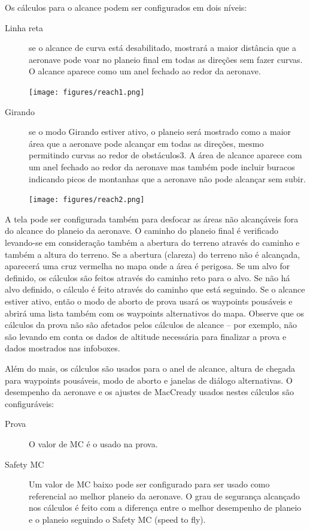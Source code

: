 Os cálculos para o alcance podem ser configurados  em dois níveis: 
\begin{description}
\item[Linha reta] se o alcance de curva está desabilitado, mostrará a maior distância 
que a aeronave pode voar no planeio final em todas as direções sem fazer curvas.  O 
alcance aparece como um anel fechado ao redor da aeronave.  

\begin{center}
\texttt{[image: figures/reach1.png]}
\end{center}

\item[Girando] se o modo Girando estiver ativo, o planeio será mostrado como a maior área 
que a aeronave pode alcançar em todas as direções, mesmo permitindo curvas ao redor de 
obstáculos3.  A área de alcance aparece com um anel fechado ao redor da aeronave mas 
também pode incluir buracos indicando picos de montanhas que a aeronave não pode alcançar 
sem subir.

\begin{center}
\texttt{[image: figures/reach2.png]}
\end{center}

\end{description}

A tela pode ser configurada também para desfocar as áreas não alcançáveis fora do alcance do planeio da aeronave.  O caminho do planeio final é verificado levando-se em consideração também a abertura do terreno através do caminho e também a altura do terreno.
Se a abertura (clareza) do terreno não é alcançada, aparecerá uma cruz vermelha no mapa onde a área é perigosa.  Se um alvo for definido, os cálculos são feitos através do caminho reto para o alvo.  Se não há alvo definido, o cálculo é feito através do caminho que está seguindo.
Se o alcance estiver ativo, então o modo de aborto de prova usará os waypoints pousáveis e abrirá uma lista também com os waypoints alternativos do mapa.
Observe que os cálculos da prova não são afetados pelos cálculos de alcance – por exemplo, não são levando em conta os dados de altitude necessária para finalizar a prova e dados mostrados nas infoboxes.

Além do mais, os cálculos são usados para o anel de alcance, altura de chegada para waypoints pousáveis, modo de aborto e janelas de diálogo alternativas.  O desempenho da aeronave e os ajustes de MacCready usados nestes cálculos são configuráveis:
\begin{description}
\item[Prova] O valor de MC é o usado na prova.
\item[Safety MC] Um valor de MC baixo pode ser configurado para ser usado como referencial ao melhor planeio da aeronave.  O grau de segurança alcançado nos cálculos é feito com a diferença entre o melhor desempenho de planeio e o planeio seguindo o Safety MC (speed to fly).  
\end{description}

